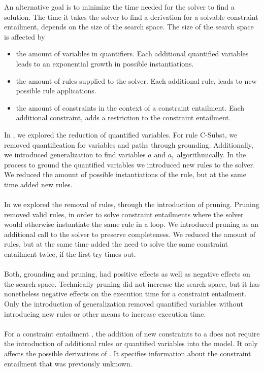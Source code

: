 An alternative goal
is to minimize the time needed for the solver to find a solution.
The time it takes the solver to find a derivation for a solvable
constraint entailment, depends on the size of the search space.
The size of the search space is affected by
\begin{itemize}
  \item the amount of variables in quantifiers.
        Each additional quantified variables leads to an exponential growth in possible instantiations.
  \item the amount of rules supplied to the solver.
        Each additional rule, leads to new possible rule applications.
  \item the amount of constraints in the context of a constraint entailment.
        Each additional constraint, adds a restriction to the constraint entailment.
\end{itemize}
In ,
we explored the reduction of quantified variables.
For rule C-Subst, we removed quantification
for variables and paths through grounding.
Additionally, we introduced generalization
to find variables $a$ and $a_1$ algorithmically.
In the process to ground the quantified variables
we introduced new rules to the solver.
We reduced the amount of possible instantiations of the rule,
but at the same time added new rules.\\
\\
In  we explored the removal of rules,
through the introduction of pruning.
Pruning removed valid rules,
in order to solve constraint entailments
where the solver would otherwise
instantiate the same rule in a loop.
We introduced pruning
as an additional call to the solver
to preserve completeness.
We reduced the amount of rules,
but at the same time added
the need to solve the same constraint entailment twice,
if the first try times out.\\
\\
Both, grounding and pruning, had positive effects
as well as negative effects on the search space.
Technically pruning did not increase the search space,
but it has nonetheless negative effects on the execution time
for a constraint entailment.
Only the introduction of generalization removed quantified variables
without introducing new rules or other means to increase execution time.\\
\\
For a constraint entailment ,
the addition of new constraints to \ovl a
does not require the introduction of
additional rules or quantified variables into the model.
It only affects the possible derivations of .
It specifies information about the constraint entailment
that was previously unknown.
\newpage

